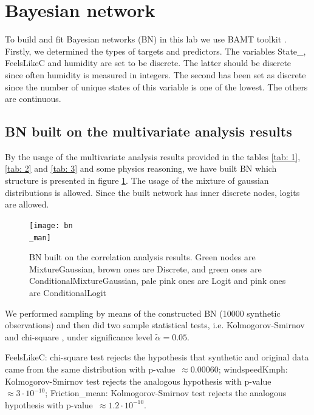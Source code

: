 \documentclass[12pt, bachelor, substylefile = algo_title.rtx]{disser}
\theoremstyle{definition}
\begin{document}
\section{Bayesian network}
To build and fit Bayesian networks (BN) in this lab we use BAMT toolkit \cite{bamt}. Firstly, we determined the types of targets and predictors. The variables State\_, FeelsLikeC and humidity are set to be discrete. The latter should be discrete since often humidity is measured in integers. The second has been set as discrete since the number of unique states of this variable is one of the lowest. The others are continuous.

\subsection{BN built on the multivariate analysis results}
By the usage of the multivariate analysis results provided in the tables \ref{tab: 1}, \ref{tab: 2} and \ref{tab: 3} and some physics reasoning, we have built BN which structure is presented in figure \ref{fig: 7}. The usage of the mixture of gaussian distributions is allowed. Since the built network has inner discrete nodes, logits are allowed.

\begin{figure}[!h]
\centering
   \begin{minipage}{0.7\textwidth}
     \texttt{[image: bn\\\_man]}
   \end{minipage}
\caption{BN built on the correlation analysis results. Green nodes are MixtureGaussian, brown ones are Discrete, and green ones are ConditionalMixtureGaussian, pale pink ones are Logit and pink ones are ConditionalLogit}
\label{fig: 7}
\end{figure}

We performed sampling by means of the constructed BN (10000 synthetic observations) and then did two sample statistical tests, i.e. Kolmogorov-Smirnov and chi-square \cite{nist}, under significance level $\widetilde{\alpha}=0.05$.
\begin{outline}
\1 FeelsLikeC: chi-square test rejects the hypothesis that synthetic and original data came from the same distribution with p-value~$ \approx 0.00060$;
\1 windspeedKmph: Kolmogorov-Smirnov test rejects the analogous hypothesis with p-value~$ \approx 3\cdot 10^{-10}$;
\1 Friction\_mean: Kolmogorov-Smirnov test rejects the analogous hypothesis with p-value~$ \approx 1.2 \cdot 10^{-10}$.
\end{outline}
\end{document}
